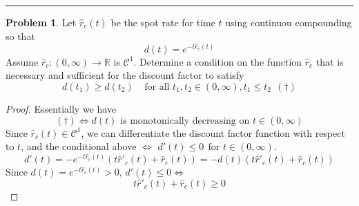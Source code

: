 \documentclass[a4paper, 10pt]{article}
\theoremstyle{definition}
\newtheorem{problem}{Problem}
\theoremstyle{hSol}
\begin{document}
\noindent\rule{16cm}{0.4pt}

\begin{problem} Let $\hat{r}_c(t)$ be the spot rate for time $t$ using continuou compounding so that 
$$
d(t) = e^{-t\hat{r}_c(t)}
$$
Assume $\hat{r}_c:(0,\infty) \to \mathbb{R}$ is $\mathcal{C}^1$. Determine a condition on the function $\hat{r}_c$ that is necessary and sufficient for the discount factor to satisfy
$$
d(t_1)\geq d(t_2)~~~~~\text{for all }t_1, t_2 \in (0, \infty), t_1 \leq t_2~~(\dag)
$$
\end{problem}
\begin{proof} Essentially we have
\begin{equation}
  (\dag) \iff d(t) \text{ is monotonically decreasing on } t\in(0, \infty)
\end{equation}
Since $\hat{r}_c(t) \in \mathcal{C}^1$, we can differentiate the discount factor function with respect to $t$, and the conditional above $\iff$ $d'(t) \leq 0~~\text{for }t \in (0, \infty)$.
$$
d'(t) = -e^{-t\hat{r}_c(t)}(t\hat{r}'_c(t) + \hat{r}_c(t)) = -d(t)(t\hat{r}'_c(t) + \hat{r}_c(t))
$$
Since $d(t) = e^{-t\hat{r}_c(t)} > 0$, $d'(t)\leq 0 \iff$
$$
t\hat{r}'_c(t) + \hat{r}_c(t) \geq 0
$$

\end{proof}
\end{document}
